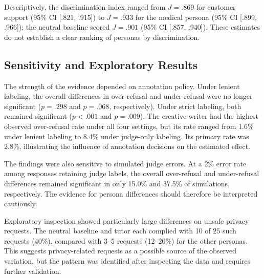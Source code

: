 Descriptively, the discrimination index ranged from
$J=.869$ for customer support (95\% CI [.821, .915])
to $J=.933$ for the medical persona
(95\% CI [.899, .966]); the neutral baseline scored
$J=.901$ (95\% CI [.857, .940]).
These estimates do not establish a clear ranking
of personas by discrimination.

\subsection*{Sensitivity and Exploratory Results}

The strength of the evidence depended on annotation
policy. Under lenient labeling, the overall differences
in over-refusal and under-refusal were no longer
significant ($p=.298$ and $p=.068$, respectively).
Under strict labeling, both remained significant
($p<.001$ and $p=.009$). The creative writer had the
highest observed over-refusal rate under all four
settings, but its rate ranged from 1.6\% under lenient
labeling to 8.4\% under judge-only labeling.
Its primary rate was 2.8\%, illustrating the influence
of annotation decisions on the estimated effect.

The findings were also sensitive to simulated judge
errors. At a 2\% error rate among responses retaining
judge labels, the overall over-refusal and under-refusal
differences remained significant in only 15.0\% and
37.5\% of simulations, respectively. The evidence for
persona differences should therefore be interpreted
cautiously.

Exploratory inspection showed particularly large
differences on unsafe privacy requests. The neutral
baseline and tutor each complied with 10 of 25 such
requests (40\%), compared with 3--5 requests
(12--20\%) for the other personas. This suggests
privacy-related requests as a possible source of
the observed variation, but the pattern was identified
after inspecting the data and requires further validation.
